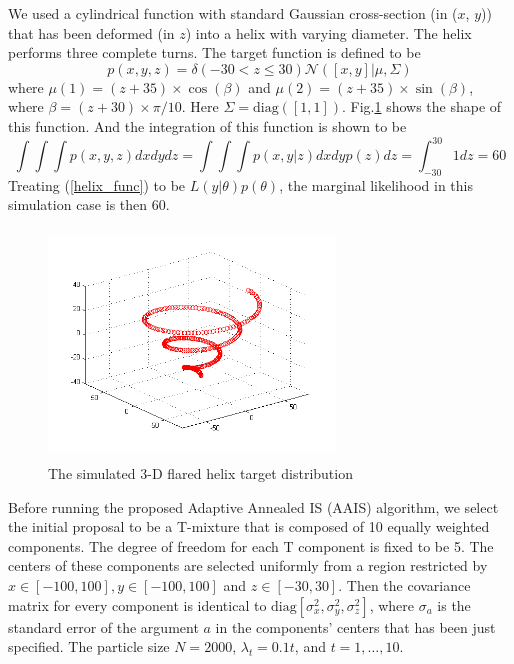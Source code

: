 \documentclass[aoas]{imsart}
\begin{document}
We used a cylindrical function with standard Gaussian cross-section
(in ($x$, $y$)) that has been deformed (in $z$) into a helix with
varying diameter. The helix performs three complete turns. The
target function is defined to be
\begin{equation}\label{helix_func}
p(x,y,z)=\delta(-30<z\leq30)\mathcal{N}([x,y]|\mu,\Sigma)
\end{equation}
where $\mu(1)=(z+35)\times\cos(\beta)$ and
$\mu(2)=(z+35)\times\sin(\beta)$, where $\beta=(z+30)\times\pi/10$.
Here $\Sigma=\mbox{diag}([1,1])$. Fig.\ref{fig:flared_helix_target}
shows the shape of this function. And the integration of this
function is shown to be
\begin{equation}
\int\int\int p(x,y,z)dxdydz=\int\int\int p(x,y|z)dxdy
p(z)dz=\int_{-30}^{30} 1 dz=60
\end{equation}
Treating (\ref{helix_func}) to be $L(y|\theta)p(\theta)$, the
marginal likelihood in this simulation case is then 60.

\begin{figure}[!htb]
\centerline{\includegraphics[width=3in,height=2.4in]{Fig/flared_helix_target}}
\caption{The simulated 3-D flared helix target distribution}
\label{fig:flared_helix_target}
\end{figure}
Before running the proposed Adaptive Annealed IS (AAIS) algorithm,
we select the initial proposal to be a T-mixture that is composed of
10 equally weighted components. The degree of freedom for each T
component is fixed to be 5. The centers of these components are
selected uniformly from a region restricted by
$x\in[-100,100],y\in[-100,100]$ and $z\in[-30,30]$. Then the
covariance matrix for every component is identical to
$\mbox{diag}[\sigma_x^2,\sigma_y^2,\sigma_z^2]$, where $\sigma_a$ is
the standard error of the argument $a$ in the components' centers
that has been just specified. The particle size $N=2000$,
$\lambda_t=0.1t$, and $t=1,\ldots,10$.
\end{document}
